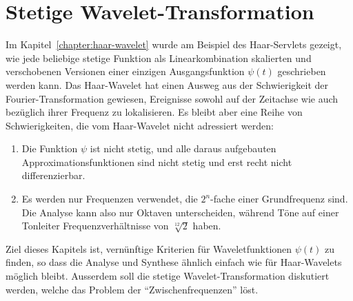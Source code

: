 %
%
%
\chapter{Stetige Wavelet-Transformation
\label{chapter:cwt}}
Im Kapitel~\ref{chapter:haar-wavelet} wurde am Beispiel des Haar-Servlets
gezeigt, wie jede beliebige stetige Funktion als Linearkombination 
skalierten und verschobenen Versionen einer einzigen Ausgangsfunktion
$\psi(t)$ geschrieben werden kann.
Das Haar-Wavelet hat einen Ausweg aus der Schwierigkeit der
Fourier-Transformation gewiesen, Ereignisse sowohl auf der Zeitachse
wie auch bezüglich ihrer Frequenz zu lokalisieren.
Es bleibt aber eine Reihe von Schwierigkeiten, die vom Haar-Wavelet nicht
adressiert werden:
\begin{enumerate}
\item
Die Funktion $\psi$ ist nicht stetig, und alle daraus aufgebauten
Approximationsfunktionen sind nicht stetig
und erst recht nicht differenzierbar.
\item
Es werden nur Frequenzen verwendet, die $2^n$-fache einer Grundfrequenz
sind.
Die Analyse kann also nur Oktaven unterscheiden, während
Töne auf einer Tonleiter Frequenzverhältnisse von $\sqrt[12]{2}$ haben.
\end{enumerate}
Ziel dieses Kapitels ist, vernünftige Kriterien für Waveletfunktionen
$\psi(t)$ zu finden, so dass die Analyse und Synthese ähnlich einfach
wie für Haar-Wavelets möglich bleibt.
Ausserdem soll die stetige Wavelet-Transformation diskutiert werden,
welche das Problem der ``Zwischenfrequenzen'' löst.






